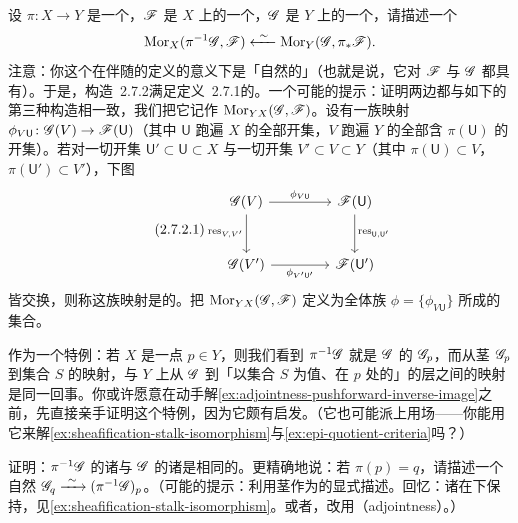 \begin{exercise}\label{ex:adjointness-pushforward-inverse-image}
设 $\pi\colon X\to Y$ 是一个\trContinuousMap，$\mathscr{F}$ 是 $X$ 上的一个\trSheaf，$\mathscr{G}$ 是 $Y$ 上的一个\trSheaf，请描述一个\trBijection{}
\[
\Mor_X(\pi^{-1}\scr{G},\scr{F})\mathrel{\xleftarrow{\ \sim\ }}\Mor_Y(\scr{G},\pi_*\scr{F}).
\]
注意：你这个\trBijection{}在伴随的定义的意义下是「自然的」（也就是说，它对 $\mathscr{F}$ 与 $\mathscr{G}$ 都具有\trFunctoriality{}）。于是，\mbox{构造~2.7.2}满足\mbox{定义~2.7.1}的\trUniversalProperty。一个可能的提示：证明两边都与如下的第三种构造相一致，我们把它记作 $\operatorname{Mor}_{YX}(\mathscr{G},\mathscr{F})$。设有一族映射 $\phi_{V\mathsf{U}}\colon\mathscr{G}(V)\to\mathscr{F}(\mathsf{U})$（其中 $\mathsf{U}$ 跑遍 $X$ 的全部开集，$V$ 跑遍 $Y$ 的全部含 $\pi(\mathsf{U})$ 的开集）。若对一切开集 $\mathsf{U}'\subset\mathsf{U}\subset X$ 与一切开集 $V'\subset V\subset Y$（其中 $\pi(\mathsf{U})\subset V$，$\pi(\mathsf{U}')\subset V'$），下图
\begin{equation*}\tag{2.7.2.1}\label{eq:compatible-collections-diagram}
\begin{tikzcd}[row sep=2.8em, column sep=4.2em]
\scr{G}(V) \ar[r, "\phi_{V\mathsf{U}}"] \ar[d, "\mathrm{res}_{V,V'}"'] & \scr{F}(\mathsf{U}) \ar[d, "\mathrm{res}_{\mathsf{U},\mathsf{U}'}"] \\
\scr{G}(V') \ar[r, "\phi_{V'\mathsf{U}'}"'] & \scr{F}(\mathsf{U}')
\end{tikzcd}
\end{equation*}
皆交换，则称这族映射是\trCompatible{}的。把 $\operatorname{Mor}_{YX}(\mathscr{G},\mathscr{F})$ 定义为全体\trCompatible{}族 $\phi=\{\phi_{V\mathsf{U}}\}$ 所成的集合。
\end{exercise}

\begin{remark}\label{thm:stalk-skyscraper-adjoint}
作为一个特例：若 $X$ 是一点 $p\in Y$，则我们看到 $\pi^{-1}\mathscr{G}$ 就是 $\mathscr{G}$ 的\trStalk{} $\mathscr{G}_p$，而从茎 $\mathscr{G}_p$ 到集合 $S$ 的映射，与 $Y$ 上从 $\mathscr{G}$ 到「以集合 $S$ 为值、\trSupport{}在 $p$ 处的\trSkyscraperSheaf」的层之间的映射是同一回事。你或许愿意在动手解\cref{ex:adjointness-pushforward-inverse-image}之前，先直接亲手证明这个特例，因为它颇有启发。（它也可能派上用场——你能用它来解\cref{ex:sheafification-stalk-isomorphism}与\cref{ex:epi-quotient-criteria}吗？）
\end{remark}

\begin{exercise}\label{ex:stalks-of-inverse-image}
证明：$\pi^{-1}\mathscr{G}$ 的诸\trStalk{}与 $\mathscr{G}$ 的诸\trStalk{}是相同的。更精确地说：若 $\pi(p)=q$，请描述一个自然\trIsomorphism{} $\scr{G}_q\mathrel{\xrightarrow{\ \sim\ }}(\pi^{-1}\scr{G})_p$。（可能的提示：利用茎作为\trColimit{}的显式描述。回忆：诸\trStalk{}在\trSheafification{}下保持，见\cref{ex:sheafification-stalk-isomorphism}。或者，改用\trAdjointness{}（adjointness）。）
\end{exercise}

